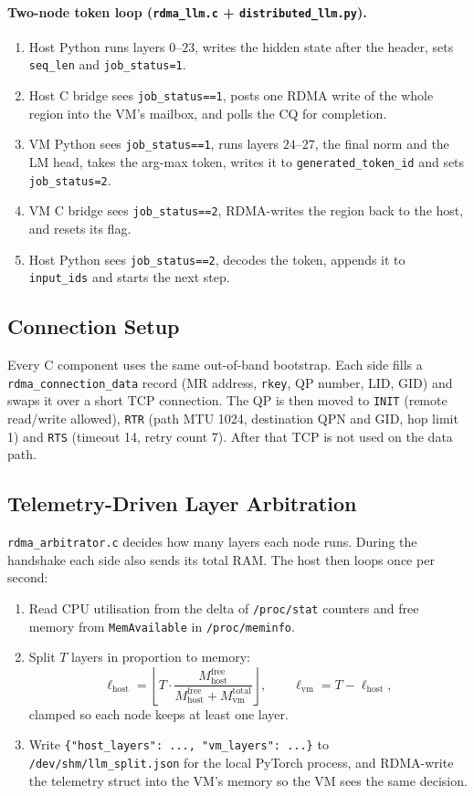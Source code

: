 \documentclass[11pt,a4paper]{article}
\begin{document}
\paragraph{Two-node token loop (\texttt{rdma\_llm.c} + \texttt{distributed\_llm.py}).}
\begin{enumerate}[leftmargin=*]
  \item Host Python runs layers $0$--$23$, writes the hidden state after the header, sets \texttt{seq\_len} and \texttt{job\_status=1}.
  \item Host C bridge sees \texttt{job\_status==1}, posts one RDMA write of the whole region into the VM's mailbox, and polls the CQ for completion.
  \item VM Python sees \texttt{job\_status==1}, runs layers $24$--$27$, the final norm and the LM head, takes the arg-max token, writes it to \texttt{generated\_token\_id} and sets \texttt{job\_status=2}.
  \item VM C bridge sees \texttt{job\_status==2}, RDMA-writes the region back to the host, and resets its flag.
  \item Host Python sees \texttt{job\_status==2}, decodes the token, appends it to \texttt{input\_ids} and starts the next step.
\end{enumerate}

\subsection{Connection Setup}
Every C component uses the same out-of-band bootstrap. Each side fills a \texttt{rdma\_connection\_data} record (MR address, \texttt{rkey}, QP number, LID, GID) and swaps it over a short TCP connection. The QP is then moved to \texttt{INIT} (remote read/write allowed), \texttt{RTR} (path MTU 1024, destination QPN and GID, hop limit 1) and \texttt{RTS} (timeout 14, retry count 7). After that TCP is not used on the data path.

\subsection{Telemetry-Driven Layer Arbitration}
\texttt{rdma\_arbitrator.c} decides how many layers each node runs. During the handshake each side also sends its total RAM. The host then loops once per second:
\begin{enumerate}[leftmargin=*]
  \item Read CPU utilisation from the delta of \texttt{/proc/stat} counters and free memory from \texttt{MemAvailable} in \texttt{/proc/meminfo}.
  \item Split $T$ layers in proportion to memory:
  \[
     \ell_{\text{host}} = \left\lfloor T \cdot \frac{M_{\text{host}}^{\text{free}}}{M_{\text{host}}^{\text{free}} + M_{\text{vm}}^{\text{total}}} \right\rfloor,
     \qquad \ell_{\text{vm}} = T - \ell_{\text{host}},
  \]
  clamped so each node keeps at least one layer.
  \item Write \texttt{\{"host\_layers": ..., "vm\_layers": ...\}} to \texttt{/dev/shm/llm\_split.json} for the local PyTorch process, and RDMA-write the telemetry struct into the VM's memory so the VM sees the same decision.
\end{enumerate}
\end{document}
